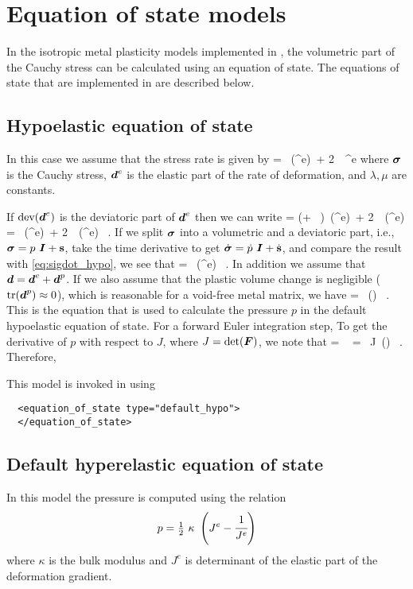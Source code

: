\chapter{Equation of state models} \label{ch:EOS}
In the isotropic metal plasticity models implemented in \Vaango, the volumetric 
part of the Cauchy stress can be calculated using an equation of state.  The 
equations of state that are implemented in \Vaango are described below.

\section{Hypoelastic equation of state}
In this case we assume that the stress rate is given by
\Beq
    \dot{\Bsig} = \lambda~\Tr(\BdT^e)~\BI + 2~\mu~\BdT^e
\Eeq
where $\boldsymbol{\sigma}$ is the Cauchy stress, $\boldsymbol{d}^e$ is the elastic part of
the rate of deformation, and $\lambda, \mu$ are constants.

If $\text{dev}(\boldsymbol{d}^e)$ is the deviatoric part of $\boldsymbol{d}^e$ then we can write
\Beq \label{eq:sigdot_hypo}
    \dot{\Bsig} = \left(\lambda + ~\mu\right)~\Tr(\BdT^e)~\BI + 
        2~\mu~\Dev(\BdT^e) = \kappa~\Tr(\BdT^e)~\BI + 2~\mu~\Dev(\BdT^e) ~.
\Eeq
If we split $\boldsymbol{\sigma}$ into a volumetric and a deviatoric part, i.e.,
$\boldsymbol{\sigma} = p~\boldsymbol{I} + \mathbf{s}$, take the time derivative to get
$\dot{\boldsymbol{\sigma}} = \dot{p}~\boldsymbol{I} + \dot{\mathbf{s}}$, and compare the result with
\eqref{eq:sigdot_hypo}, we see that
\Beq
     = \kappa~\Tr(\BdT^e) ~.
\Eeq
In addition we assume that $\boldsymbol{d} = \boldsymbol{d}^e + \boldsymbol{d}^p$.  If we also assume that 
the plastic volume change is negligible ($\text{tr}(\boldsymbol{d}^p) \approx 0$), 
which is reasonable for a void-free metal matrix, we have
\Beq
     = \kappa~\Tr(\BdT) ~.
\Eeq
This is the equation that is used to calculate the pressure $p$ in the 
default hypoelastic equation of state.  For a forward Euler integration step,
\Beq
\Eeq
To get the derivative of $p$ with respect to $J$, where $J = \det(\boldsymbol{F})$,
we note that
\Beq
     = ~ = ~J~\Tr(\BdT) ~.
\Eeq
Therefore,
\Beq
\Eeq

This model is invoked in \Vaango using
\lstset{language=XML}
\begin{lstlisting}
  <equation_of_state type="default_hypo">
  </equation_of_state>
\end{lstlisting}

\section{Default hyperelastic equation of state}
In this model the pressure is computed using the relation
\begin{equation}
  p = \tfrac{1}{2}~\kappa~\left(J^e - \cfrac{1}{J^e}\right)
\end{equation}
where $\kappa$ is the bulk modulus and $J^e$ is determinant of the elastic 
part of the deformation gradient.


